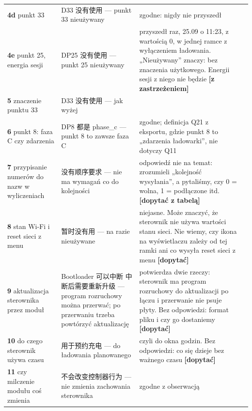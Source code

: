 \documentclass[11pt,a4paper]{article}
\begin{document}
\begin{longtable}{>{\raggedright\arraybackslash}p{3.26cm}>{\raggedright\arraybackslash}p{5.20cm}>{\raggedright\arraybackslash}p{5.43cm}>{\raggedright\arraybackslash}p{0.95cm}}
\textbf{4d} punkt 33 & D33 {\cjkfont 没有使用} — punkt 33 nieużywany & zgodne: nigdy nie przyszedł & \leavevmode{\symbolfont\color{apgreen}\textbf{✔}} \\
\textbf{4e} punkt 25, energia sesji & DP25 {\cjkfont 没有使用} — punkt 25 nieużywany & przyszedł raz, 25.09 o 11:23, z wartością 0, w jednej ramce z wyłączeniem ładowania. „Nieużywany” znaczy: bez znaczenia użytkowego. Energii sesji z niego nie będzie \textbf{[z zastrzeżeniem]} & \leavevmode{\symbolfont\color{apgreen}\textbf{✔}} \\
\textbf{5} znaczenie punktu 33 & D33 {\cjkfont 没有使用} — jak wyżej &  & \leavevmode{\symbolfont\color{apgreen}\textbf{✔}} \\
\textbf{6} punkt 8: faza C czy zdarzenia & DP8 {\cjkfont 都是} phase\_c — punkt 8 to zawsze faza C & zgodne; definicja Q21 z eksportu, gdzie punkt 8 to „zdarzenia ładowarki”, nie dotyczy Q11 & \leavevmode{\symbolfont\color{apgreen}\textbf{✔}} \\
\textbf{7} przypisanie numerów do nazw w wyliczeniach & {\cjkfont 没有顺序要求} — nie ma wymagań co do kolejności & odpowiedź nie na temat: zrozumieli „kolejność wysyłania”, a pytaliśmy, czy 0 = wolna, 1 = podłączone itd. \textbf{[dopytać z tabelą]} & \leavevmode{\symbolfont\color{apred}\textbf{✘}} \\
\textbf{8} stan Wi-Fi i reset sieci z menu & {\cjkfont 暂时没有用} — na razie nieużywane & niejasne. Może znaczyć, że sterownik nie używa wartości stanu sieci. Nie wiemy, czy ikona na wyświetlaczu zależy od tej ramki ani co wysyła reset sieci z menu \textbf{[dopytać]} & \leavevmode{\symbolfont\color{apred}\textbf{✘}} \\
\textbf{9} aktualizacja sterownika przez moduł & Bootloader {\cjkfont 可以中断} {\cjkfont 中断后需要重新升级} — program rozruchowy można przerwać; po przerwaniu trzeba powtórzyć aktualizację & potwierdza dwie rzeczy: sterownik ma program rozruchowy do aktualizacji po łączu i przerwanie nie psuje płyty. Bez odpowiedzi: format pliku i czy go dostaniemy \textbf{[dopytać]} & \leavevmode{\symbolfont\color{apamber}\textbf{◐}} \\
\textbf{10} do czego sterownik używa czasu & {\cjkfont 用于预约充电} — do ładowania planowanego & czyli do okna godzin. Bez odpowiedzi: co się dzieje bez ważnego czasu \textbf{[dopytać]} & \leavevmode{\symbolfont\color{apamber}\textbf{◐}} \\
\textbf{11} czy milczenie modułu coś zmienia & {\cjkfont 不会改变控制器行为} — nie zmienia zachowania sterownika & zgodne z obserwacją & \leavevmode{\symbolfont\color{apgreen}\textbf{✔}} \\
\end{longtable}
\end{document}

